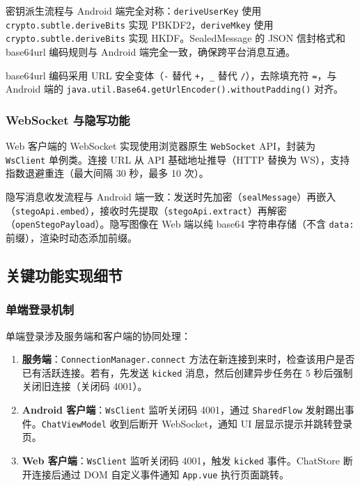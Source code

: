 密钥派生流程与 Android 端完全对称：\texttt{deriveUserKey} 使用 \texttt{crypto.subtle.deriveBits} 实现 PBKDF2，\texttt{deriveMkey} 使用 \texttt{crypto.subtle.deriveBits} 实现 HKDF。SealedMessage 的 JSON 信封格式和 base64url 编码规则与 Android 端完全一致，确保跨平台消息互通。

base64url 编码采用 URL 安全变体（\texttt{-} 替代 \texttt{+}，\texttt{\_} 替代 \texttt{/}），去除填充符 \texttt{=}，与 Android 端的 \texttt{java.util.Base64.getUrlEncoder().withoutPadding()} 对齐。

\subsubsection{WebSocket 与隐写功能}

Web 客户端的 WebSocket 实现使用浏览器原生 \texttt{WebSocket} API，封装为 \texttt{WsClient} 单例类。连接 URL 从 API 基础地址推导（HTTP 替换为 WS），支持指数退避重连（最大间隔 30 秒，最多 10 次）。

隐写消息收发流程与 Android 端一致：发送时先加密（\texttt{sealMessage}）再嵌入（\texttt{stegoApi.embed}），接收时先提取（\texttt{stegoApi.extract}）再解密（\texttt{openStegoPayload}）。隐写图像在 Web 端以纯 base64 字符串存储（不含 \texttt{data:} 前缀），渲染时动态添加前缀。

\subsection{关键功能实现细节}

\subsubsection{单端登录机制}

单端登录涉及服务端和客户端的协同处理：

\begin{enumerate}
    \item \textbf{服务端}：\texttt{ConnectionManager.connect} 方法在新连接到来时，检查该用户是否已有活跃连接。若有，先发送 \texttt{kicked} 消息，然后创建异步任务在 5 秒后强制关闭旧连接（关闭码 4001）。
    \item \textbf{Android 客户端}：\texttt{WsClient} 监听关闭码 4001，通过 \texttt{SharedFlow} 发射踢出事件。\texttt{ChatViewModel} 收到后断开 WebSocket，通知 UI 层显示提示并跳转登录页。
    \item \textbf{Web 客户端}：\texttt{WsClient} 监听关闭码 4001，触发 \texttt{kicked} 事件。ChatStore 断开连接后通过 DOM 自定义事件通知 \texttt{App.vue} 执行页面跳转。
\end{enumerate}

